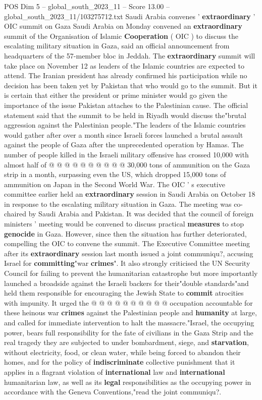 \begin{textsample}{POS Dim 5 – global\_south\_2023\_11 – Score 13.00 – global\_south\_2023\_11/103275712.txt}  \label{ex:f5_pos_276}
Saudi Arabia convenes ' \textbf{extraordinary} ' OIC summit on Gaza Saudi Arabia on Monday convened an \textbf{extraordinary} summit of the Organisation of Islamic \textbf{Cooperation} ( OIC ) to discuss the escalating military situation in Gaza, said an official announcement from headquarters of the 57-member bloc in Jeddah.
The \textbf{extraordinary} summit will take place on November 12 as leaders of the Islamic countries are expected to attend.
The Iranian president has already confirmed his participation while no decision has been taken yet by Pakistan that who would go to the summit.
But it is certain that either the president or prime minister would go given the importance of the issue Pakistan attaches to the Palestinian cause.
The official statement said that the summit to be held in Riyadh would discuss the"brutal aggression against the Palestinian people."The leaders of the Islamic countries would gather after over a month since Israeli forces launched a brutal assault against the people of Gaza after the unprecedented operation by Hamas.
The number of people killed in the Israeli military offensive has crossed 10,000 with almost half of @ @ @ @ @ @ @ @ @ @ 30,000 tons of ammunition on the Gaza strip in a month, surpassing even the US, which dropped 15,000 tons of ammunition on Japan in the Second World War.
The OIC ' s executive committee earlier held an \textbf{extraordinary} session in Saudi Arabia on October 18 in response to the escalating military situation in Gaza.
The meeting was co-chaired by Saudi Arabia and Pakistan.
It was decided that the council of foreign ministers ' meeting would be convened to discuss practical \textbf{measures} to stop \textbf{genocide} in Gaza.
However, since then the situation has further deteriorated, compelling the OIC to convene the summit.
The Executive Committee meeting after its \textbf{extraordinary} session last month issued a joint communiqu?, accusing Israel for \textbf{committing}"war \textbf{crimes}".
It also strongly criticised the UN Security Council for failing to prevent the humanitarian catastrophe but more importantly launched a broadside against the Israeli backers for their"double standards"and held them responsible for encouraging the Jewish State to \textbf{commit} atrocities with impunity.
It urged the @ @ @ @ @ @ @ @ @ @ occupation accountable for these heinous war \textbf{crimes} against the Palestinian people and \textbf{humanity} at large, and called for immediate intervention to halt the massacre."Israel, the occupying power, bears full responsibility for the fate of civilians in the Gaza Strip and the real tragedy they are subjected to under bombardment, siege, and \textbf{starvation}, without electricity, food, or clean water, while being forced to abandon their homes, and for the policy of \textbf{indiscriminate} collective punishment that it applies in a flagrant violation of \textbf{international} law and \textbf{international} humanitarian law, as well as its \textbf{legal} responsibilities as the occupying power in accordance with the Geneva Conventions,"read the joint communiqu?.

\end{textsample}
